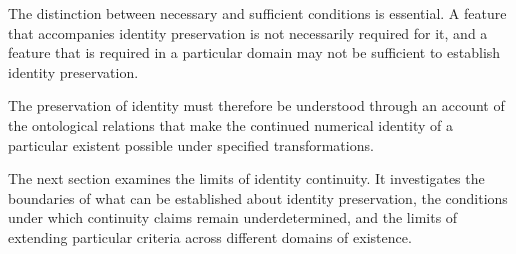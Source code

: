 The distinction between necessary and sufficient
conditions is essential. A feature that accompanies
identity preservation is not necessarily required
for it, and a feature that is required in a
particular domain may not be sufficient to establish
identity preservation.

The preservation of identity must therefore be
understood through an account of the ontological
relations that make the continued numerical identity
of a particular existent possible under specified
transformations.

The next section examines the limits of identity
continuity. It investigates the boundaries of
what can be established about identity preservation,
the conditions under which continuity claims remain
underdetermined, and the limits of extending
particular criteria across different domains
of existence.


